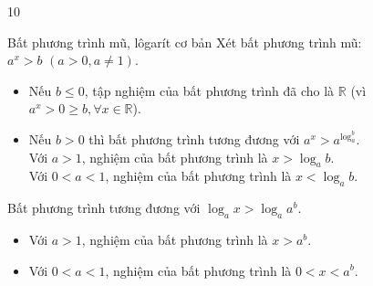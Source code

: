 \begin{indapan}{10}
\begin{dang}{Bất phương trình mũ, lôgarít cơ bản}
	Xét bất phương trình mũ: $a^x>b\, \, (a>0, a\neq 1)$.
	\begin{itemize}
		\item[•] Nếu $b\leq 0$, tập nghiệm của bất phương trình đã cho là $\mathbb{R}$ (vì $a^x>0\geq b, \forall x\in \mathbb{R}$).
		\item[•] Nếu $b>0$ thì bất phương trình tương đương với $a^x>a^{\log_a^b}$.\\
		Với $a>1$, nghiệm của bất phương trình là $x>\log_a b$.\\
		Với $0<a<1$, nghiệm của bất phương trình là $x<\log_a b$.		
	\end{itemize}
	Bất phương trình tương đương với $\log_a x>\log_a a^b$.
	\begin{itemize}
		\item[•] Với $a>1$, nghiệm của bất phương trình là $x>a^b$.
		\item[•] Với $0<a<1$, nghiệm của bất phương trình là $0<x<a^b$.
	\end{itemize}
\end{dang}

\end{indapan}
